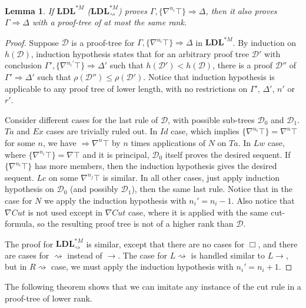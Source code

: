 \documentclass[12pt,a4paper]{article}
\theoremstyle{plain}
\newtheorem{lem}[thm]{Lemma}
\theoremstyle{definition}
\begin{document}
\begin{lem}\label{lem:ldls-top-redundant} If $\mathbf{LDL}^{*M}$ ($\mathbf{LDL}^{*M}_{\rightsquigarrow}$) proves $\Gamma , \{\nabla^{n_i} \top\} \Rightarrow \Delta$, then it also proves $\Gamma \Rightarrow \Delta$ with a proof-tree of at most the same rank.
\end{lem}
\begin{proof}
Suppose $\mathcal{D}$ is a proof-tree for $\Gamma , \{\nabla^{n_i} \top\} \Rightarrow \Delta$ in $\mathbf{LDL}^{*M}$. By induction on $h(\mathcal{D})$, induction hypothesis states that for an arbitrary proof tree $\mathcal{D}'$ with conclusion $\Gamma' , \{\nabla^{n_i'} \top\} \Rightarrow \Delta'$ such that $h(\mathcal{D}') < h(\mathcal{D})$, there is a proof $\mathcal{D}''$ of $\Gamma' \Rightarrow \Delta'$ such that $\rho(\mathcal{D}'') \leq \rho(\mathcal{D}')$. Notice that induction hypothesis is applicable to any proof tree of lower length, with no restrictions on $\Gamma'$, $\Delta'$, $n'$ or $r'$.

Consider different cases for the last rule of $\mathcal{D}$, with possible sub-trees $\mathcal{D}_0$ and $\mathcal{D}_1$. $Ta$ and $Ex$ cases are trivially ruled out. In $Id$ case, which implies $\{\nabla^{n_i} \top\} = \nabla^n \top$ for some $n$, we have $\Rightarrow \nabla^n \top$ by $n$ times applications of $N$ on $Ta$. In $Lw$ case, where $\{\nabla^{n_i} \top\} = \nabla \top$ and it is principal, $\mathcal{D}_0$ itself proves the desired sequent. If $\{\nabla^{n_i} \top\}$ has more members, then the induction hypothesis gives the desired sequent. $Lc$ on some $\nabla^{n_j} \top$ is similar. In all other cases, just apply induction hypothesis on $\mathcal{D}_0$ (and possibly $\mathcal{D}_1$), then the same last rule. Notice that in the case for $N$ we apply the induction hypothesis with $n_i' = n_i - 1$. Also notice that $\nabla Cut$ is not used except in $\nabla Cut$ case, where it is applied with the same cut-formula, so the resulting proof tree is not of a higher rank than $\mathcal{D}$.

The proof for $\mathbf{LDL}^{*M}_{\rightsquigarrow}$ is similar, except that there are no cases for $\Box$, and there are cases for $\rightsquigarrow$ instead of $\rightarrow$. The case for $L\rightsquigarrow$ is handled similar to $L\rightarrow$, but in $R\rightsquigarrow$ case, we must apply the induction hypothesis with $n_i' = n_i + 1$.
\end{proof}

The following theorem shows that we can imitate any instance of the cut rule in a proof-tree of lower rank.
\end{document}
